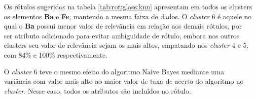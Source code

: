 Os rótulos sugeridos na tabela \ref{tab:rot:glass:knn} apresentam em todos os clusters os elementos \textbf{Ba} e \textbf{Fe}, mantendo a mesma faixa de dados. O \textit{cluster} 6 é aquele no qual o \textbf{Ba} possui menor valor de relevância em relação aos demais rótulos, por ser atributo adicionado para evitar ambiguidade de rótulo, embora nos outros clusters seu valor de relevância sejam os mais altos, empatando nos \textit{cluster} 4 e 5, com 84\% e 100\% respectivamente. 


O \textit{cluster} 6 teve o mesmo efeito do algoritmo Naive Bayes mediante uma variância com valor mais alto ao maior valor de taxa de acerto do algoritmo no \textit{cluster}. Nesse caso, todos os atributos são incluídos no rótulo.



